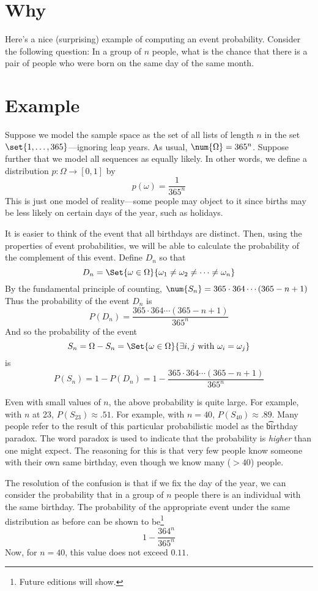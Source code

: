 
\section*{Why}

Here's a nice (surprising) example of computing an event probability.
Consider the following question:
In a group of $n$ people, what is the chance that there is a pair of people who were born on the same day of the same month.

\section*{Example}

Suppose we model the sample space as the set of all lists of length $n$ in the set $\set{1, \dots , 365}$---ignoring leap years.
As usual, $\num{\Omega } = 365^n$.
Suppose further that we model all sequences as equally likely.
In other words, we define a distribution $p: \Omega  \to [0,1]$ by
\[
p(\omega ) = \frac{1}{365^n}
\]
This is just one model of reality---some people may object to it since births may be less likely on certain days of the year, such as holidays.

It is easier to think of the event that all birthdays are distinct.
Then, using the properties of event probabilities, we will be able to calculate the probability of the complement of this event.
Define $D_n$ so that
\[
D_n = \Set{\omega  \in \Omega }{\omega _1 \neq \omega _2 \neq \cdots \neq \omega _n}
\]
By the fundamental principle of counting, $\num{S_n} = 365\cdot 364\cdots(365-n+1)$
Thus the probability of the event $D_n$ is
\[
P(D_n) = \frac{365\cdot 364\cdots(365-n+1)}{365^n}
\]
And so the probability of the event
\[
S_n = \Omega  - S_n = \Set{\omega  \in \Omega }{\exists i,j \text{ with } \omega _i = \omega _j}
\]
is
\[
P(S_n) = 1 - P(D_n) = 1 - \frac{365\cdot 364\cdots(365-n+1)}{365^n}
\]

Even with small values of $n$, the above probability is quite large.
For example, with $n$ at 23, $P(S_{23}) \approx .51$.
For example, with $n = 40$, $P(S_{40}) \approx .89$.
Many people refer to the result of this particular probabilistic model as the \t{birthday paradox}.
The word paradox is used to indicate that the probability is \textit{higher} than one might expect.
The reasoning for this is that very few people know someone with their own same birthday, even though we know many ($>40$) people.

The resolution of the confusion is that if we fix the day of the year, we can consider the probability that in a group of $n$ people there is an individual with the same birthday.
The probability of the appropriate event under the same distribution as before can be shown to be\footnote{Future editions will show.}
\[
1 - \frac{364^n}{365^n}
\]
Now, for $n = 40$, this value does not exceed $0.11$.

\blankpage